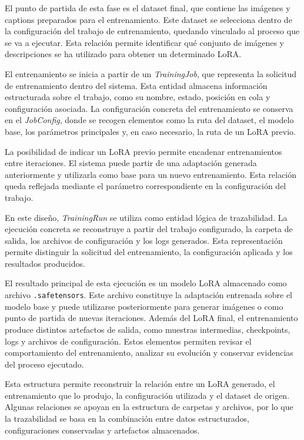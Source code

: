 \documentclass[a4paper,11pt,titlepage]{scrbook}
\begin{document}
El punto de partida de esta fase es el dataset final, que contiene las imágenes y captions preparados para el entrenamiento. Este dataset se selecciona dentro de la configuración del trabajo de entrenamiento, quedando vinculado al proceso que se va a ejecutar. Esta relación permite identificar qué conjunto de imágenes y descripciones se ha utilizado para obtener un determinado LoRA.

\medskip

El entrenamiento se inicia a partir de un \textit{TrainingJob}, que representa la solicitud de entrenamiento dentro del sistema. Esta entidad almacena información estructurada sobre el trabajo, como su nombre, estado, posición en cola y configuración asociada. La configuración concreta del entrenamiento se conserva en el \textit{JobConfig}, donde se recogen elementos como la ruta del dataset, el modelo base, los parámetros principales y, en caso necesario, la ruta de un LoRA previo.

\medskip

La posibilidad de indicar un LoRA previo permite encadenar entrenamientos entre iteraciones. El sistema puede partir de una adaptación generada anteriormente y utilizarla como base para un nuevo entrenamiento. Esta relación queda reflejada mediante el parámetro correspondiente en la configuración del trabajo.

\medskip

En este diseño, \textit{TrainingRun} se utiliza como entidad lógica de trazabilidad. La ejecución concreta se reconstruye a partir del trabajo configurado, la carpeta de salida, los archivos de configuración y los logs generados. Esta representación permite distinguir la solicitud del entrenamiento, la configuración aplicada y los resultados producidos.

\medskip

El resultado principal de esta ejecución es un modelo LoRA almacenado como archivo \texttt{.safetensors}. Este archivo constituye la adaptación entrenada sobre el modelo base y puede utilizarse posteriormente para generar imágenes o como punto de partida de nuevas iteraciones. Además del LoRA final, el entrenamiento produce distintos artefactos de salida, como muestras intermedias, checkpoints, logs y archivos de configuración. Estos elementos permiten revisar el comportamiento del entrenamiento, analizar su evolución y conservar evidencias del proceso ejecutado.

\medskip

Esta estructura permite reconstruir la relación entre un LoRA generado, el entrenamiento que lo produjo, la configuración utilizada y el dataset de origen. Algunas relaciones se apoyan en la estructura de carpetas y archivos, por lo que la trazabilidad se basa en la combinación entre datos estructurados, configuraciones conservadas y artefactos almacenados.
\end{document}

